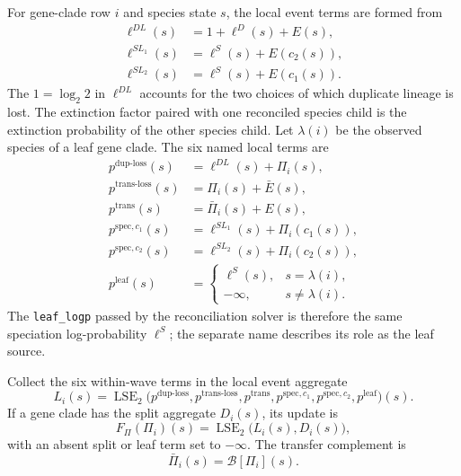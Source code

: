 \documentclass[11pt]{article}
\newcommand{\LSE}{\operatorname{LSE}_2}
\begin{document}
For gene-clade row $i$ and species state $s$, the local event terms are
formed from
\begin{align}
  \ell^{DL}(s)&=1+\ell^D(s)+E(s), \\
  \ell^{SL_1}(s)&=\ell^S(s)+E(c_2(s)), \\
  \ell^{SL_2}(s)&=\ell^S(s)+E(c_1(s)).
\end{align}
The $1=\log_2 2$ in $\ell^{DL}$ accounts for the two choices of which
duplicate lineage is lost.  The extinction factor paired with one reconciled
species child is the extinction probability of the other species child.  Let
$\lambda(i)$ be the observed species of a leaf gene clade.  The six named
local terms are
\begin{align}
  p^{\mathrm{dup\text{-}loss}}(s)
    &=\ell^{DL}(s)+\Pi_i(s), \\
  p^{\mathrm{trans\text{-}loss}}(s)
    &=\Pi_i(s)+\bar E(s), \\
  p^{\mathrm{trans}}(s)
    &=\bar\Pi_i(s)+E(s), \\
  p^{\mathrm{spec},c_1}(s)
    &=\ell^{SL_1}(s)+\Pi_i(c_1(s)), \\
  p^{\mathrm{spec},c_2}(s)
    &=\ell^{SL_2}(s)+\Pi_i(c_2(s)), \\
  p^{\mathrm{leaf}}(s)
    &=
    \begin{cases}
      \ell^S(s),&s=\lambda(i),\\
      -\infty,&s\ne\lambda(i).
    \end{cases}
\end{align}
The \texttt{leaf\_logp} passed by the reconciliation solver is therefore the
same speciation log-probability $\ell^S$; the separate name describes its role
as the leaf source.

Collect the six within-wave terms in the local event aggregate
\begin{equation}
  L_i(s)=\LSE\bigl(
    p^{\mathrm{dup\text{-}loss}},
    p^{\mathrm{trans\text{-}loss}},
    p^{\mathrm{trans}},
    p^{\mathrm{spec},c_1},
    p^{\mathrm{spec},c_2},
    p^{\mathrm{leaf}}
  \bigr)(s).
  \label{eq:local-event-aggregate}
\end{equation}
If a gene clade has the split aggregate $D_i(s)$, its update is
\begin{equation}
  F_\Pi(\Pi_i)(s)
  =\LSE\bigl(L_i(s),D_i(s)\bigr),
  \label{eq:pi-wave}
\end{equation}
with an absent split or leaf term set to $-\infty$.  The transfer complement is
\begin{equation}
  \bar\Pi_i(s)=\mathcal B[\Pi_i](s).
  \label{eq:pibar}
\end{equation}
\end{document}
